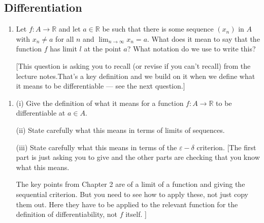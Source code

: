 \documentclass[letterpaper,10pt,english]{jupyterBook}
\begin{document}
\subsection{Differentiation}
\label{\detokenize{Problems:differentiation}}\label{\detokenize{Problems:ch4prob}}\label{\detokenize{Problems:id37}}\begin{enumerate}
%
\setcounter{enumi}{36}
\item {} 
\sphinxAtStartPar
Let \(f:A\to\mathbb{R}\) and let \(a\in\mathbb{R}\) be such that there is some sequence \((x_n)\) in \(A\) with
\(x_n\neq a\) for all \(n\) and \(\displaystyle\lim_{n\to\infty} x_n=a\). What does it mean to say that
the function \(f\) has limit \(l\) at the point \(a\)? What notation do we use to write this?

{[}This question is asking you to recall (or revise if you can’t recall)  from the lecture notes.That’s a key definition and we build on it when we define what it means to be differentiable — see the next question.{]}

\end{enumerate}
\label{\detokenize{Problems:id38}}\begin{enumerate}
%
\setcounter{enumi}{37}
\item {} 
\sphinxAtStartPar
(i) Give the definition of what it means for a function \(f:A\to\mathbb{R}\) to be differentiable at \(a \in A\).

\sphinxAtStartPar
(ii) State carefully what this means in terms of limits of sequences.

\sphinxAtStartPar
(iii) State carefully what this means in terms of the \(\varepsilon-\delta\) criterion.
{[}The first part is just asking you to give  and the other parts are checking that you know what this means.

The key points from Chapter 2 are  of a limit of a function and  giving the sequential criterion. But you need to see how to apply these, not just copy them out. Here they have to be applied to the relevant function for the definition of differentiability, not \(f\) itself. {]}

\end{enumerate}
\end{document}
